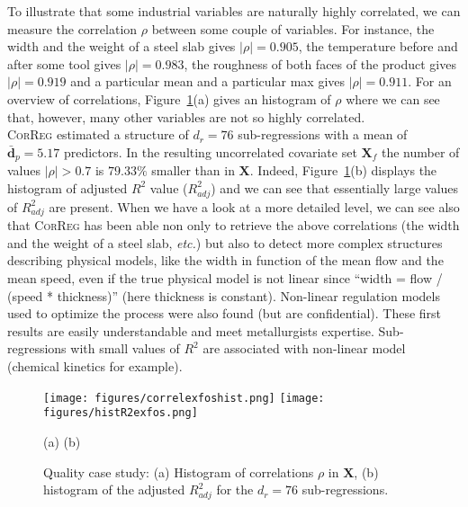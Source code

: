\documentclass[12pt,a4paper]{report}
\begin{document}
To illustrate that some industrial variables are naturally highly correlated, we can measure the correlation $\rho$ between some couple of variables. For instance, the width and the weight of a steel slab gives $|\rho|=0.905$, the temperature before and after some tool gives $|\rho|=0.983$, the  roughness of both faces of the product gives $|\rho|= 0.919$ and a particular mean and a particular max gives $|\rho|=0.911$. For an overview of correlations, Figure~\ref{fig:graphCorr.quality}(a) gives an histogram of $\rho$ where we can see that, however, many other variables are not so highly correlated.\\

\textsc{CorReg} estimated a structure of $d_r=76$ sub-regressions with a mean of $\bar{\boldsymbol{d}}_p=5.17$ predictors. In the resulting uncorrelated covariate set $\boldsymbol{X}_f$ the number of values $|\rho|>0.7$ is $79.33\%$ smaller than in $\boldsymbol{X}$. Indeed, Figure~\ref{fig:graphCorr.quality}(b) displays the histogram of adjusted $R^2$ value ($R^2_{adj}$) and we can see that essentially large values of $R^2_{adj}$ are present. When we have a look at a more detailed level, we can see also that \textsc{CorReg} has been able non only to retrieve the above correlations (the width and the weight of a steel slab, {\it etc.}) but also to detect more complex structures describing physical models, like the width in function of the mean flow and the mean speed, even if the true physical model is not linear since ``width = flow / (speed * thickness)'' (here thickness is constant). Non-linear regulation models used to optimize the process were also found (but are confidential). These first results are easily understandable and meet metallurgists expertise.  Sub-regressions with small values of $R^2$ are associated with non-linear model (chemical kinetics for example).
		
\begin{figure}[h!]
\begin{center}
			\texttt{[image: figures/correlexfoshist.png]}
			\texttt{[image: figures/histR2exfos.png]}
\end{center}
\vspace{-5mm}
			\centerline{(a) \hspace{130px} (b)}
			\caption{Quality case study: (a) Histogram of correlations $\rho$ in $\boldsymbol{X}$, (b) histogram of the adjusted $R^2_{adj}$ for the $d_r=76$ sub-regressions.}\label{fig:graphCorr.quality}
\end{figure}  			
		
\end{document}
